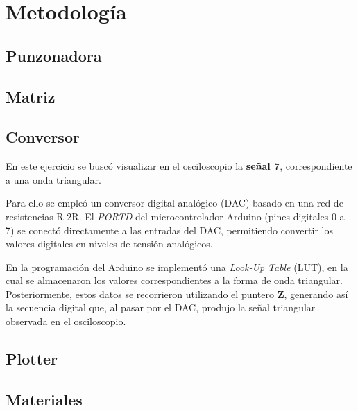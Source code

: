 \section{Metodología}
    \subsection{Punzonadora}
    \subsection{Matriz}
    \subsection{Conversor}\vspace{0.5em}
    \hspace{2em}En este ejercicio se buscó visualizar en el osciloscopio la \textbf{señal 7}, correspondiente a una onda triangular.

    \hspace{2em}Para ello se empleó un conversor digital-analógico (DAC) basado en una red de resistencias R-2R. El \textit{PORTD} del microcontrolador Arduino (pines digitales 0 a 7) se conectó directamente a las entradas del DAC, permitiendo convertir los valores digitales en niveles de tensión analógicos.

    \hspace{2em}En la programación del Arduino se implementó una \textit{Look-Up Table} (LUT), en la cual se almacenaron los valores correspondientes a la forma de onda triangular. Posteriormente, estos datos se recorrieron utilizando el puntero \textbf{Z}, generando así la secuencia digital que, al pasar por el DAC, produjo la señal triangular observada en el osciloscopio.

    \subsection{Plotter}
    \subsection{Materiales}